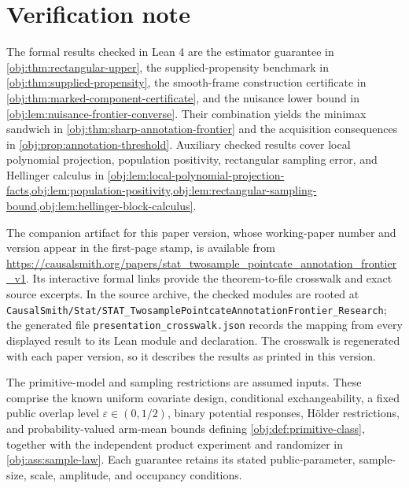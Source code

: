 \section{Verification note}\label{sec:verification-note}

The formal results checked in Lean 4 are the estimator guarantee in \cref{obj:thm:rectangular-upper}, the supplied-propensity benchmark in \cref{obj:thm:supplied-propensity}, the smooth-frame construction certificate in \cref{obj:thm:marked-component-certificate}, and the nuisance lower bound in \cref{obj:lem:nuisance-frontier-converse}. Their combination yields the minimax sandwich in \cref{obj:thm:sharp-annotation-frontier} and the acquisition consequences in \cref{obj:prop:annotation-threshold}. Auxiliary checked results cover local polynomial projection, population positivity, rectangular sampling error, and Hellinger calculus in \cref{obj:lem:local-polynomial-projection-facts,obj:lem:population-positivity,obj:lem:rectangular-sampling-bound,obj:lem:hellinger-block-calculus}.

The companion artifact for this paper version, whose working-paper number and version appear in the first-page stamp, is available from \url{https://causalsmith.org/papers/stat_twosample_pointcate_annotation_frontier_v1}. Its interactive formal links provide the theorem-to-file crosswalk and exact source excerpts. In the source archive, the checked modules are rooted at \texttt{CausalSmith/Stat/STAT\_TwosamplePointcateAnnotationFrontier\_Research}; the generated file \texttt{presentation\_crosswalk.json} records the mapping from every displayed result to its Lean module and declaration. The crosswalk is regenerated with each paper version, so it describes the results as printed in this version.

The primitive-model and sampling restrictions are assumed inputs. These comprise the known uniform covariate design, conditional exchangeability, a fixed public overlap level \(\varepsilon\in(0,1/2)\), binary potential responses, H\"older restrictions, and probability-valued arm-mean bounds defining \cref{obj:def:primitive-class}, together with the independent product experiment and randomizer in \cref{obj:ass:sample-law}. Each guarantee retains its stated public-parameter, sample-size, scale, amplitude, and occupancy conditions.

